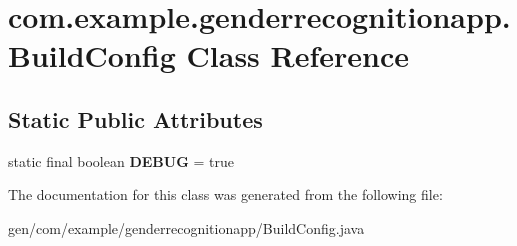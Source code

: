 \hypertarget{classcom_1_1example_1_1genderrecognitionapp_1_1_build_config}{}\section{com.\+example.\+genderrecognitionapp.\+Build\+Config Class Reference}
\label{classcom_1_1example_1_1genderrecognitionapp_1_1_build_config}
\subsection*{Static Public Attributes}
\begin{DoxyCompactItemize}
\item 
\hypertarget{classcom_1_1example_1_1genderrecognitionapp_1_1_build_config_a473a897e4d5b28a83846569de3fc6021}{}static final boolean {\bfseries D\+E\+B\+U\+G} = true\label{classcom_1_1example_1_1genderrecognitionapp_1_1_build_config_a473a897e4d5b28a83846569de3fc6021}

\end{DoxyCompactItemize}


The documentation for this class was generated from the following file\+:\begin{DoxyCompactItemize}
\item 
gen/com/example/genderrecognitionapp/Build\+Config.\+java\end{DoxyCompactItemize}
